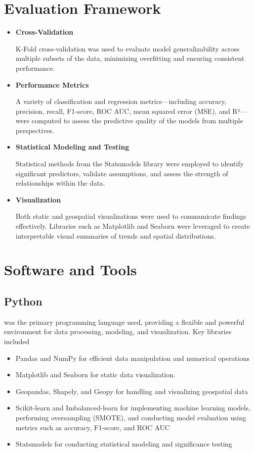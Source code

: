 \documentclass{report}
\begin{document}
\section{Evaluation Framework}

\begin{itemize}
\item \textbf{Cross-Validation}
  \par K-Fold cross-validation was used to evaluate model generalizability across multiple subsets of the data, minimizing overfitting and ensuring consistent performance.
  
\item \textbf{Performance Metrics}
  \par A variety of classification and regression metrics—including accuracy, precision, recall, F1-score, ROC AUC, mean squared error (MSE), and R²—were computed to assess the predictive quality of the models from multiple perspectives.
  
\item \textbf{Statistical Modeling and Testing}
  \par Statistical methods from the Statsmodels library were employed to identify significant predictors, validate assumptions, and assess the strength of relationships within the data.
  
\item \textbf{Visualization}
  \par Both static and geospatial visualizations were used to communicate findings effectively. Libraries such as Matplotlib and Seaborn were leveraged to create interpretable visual summaries of trends and spatial distributions.
\end{itemize}

\section{Software and Tools}
\subsection{Python}
\par was the primary programming language used, providing a flexible and powerful environment for data processing, modeling, and visualization. Key libraries included
\begin{itemize}
\item Pandas and NumPy for efficient data manipulation and numerical operations
\item Matplotlib and Seaborn for static data visualization.
\item Geopandas, Shapely, and Geopy for handling and visualizing geospatial data
\item Scikit-learn and Imbalanced-learn for implementing machine learning models, performing oversampling (SMOTE), and conducting model evaluation using metrics such as accuracy, F1-score, and ROC AUC
\item Statsmodels for conducting statistical modeling and significance testing
\end{itemize}
\end{document}
